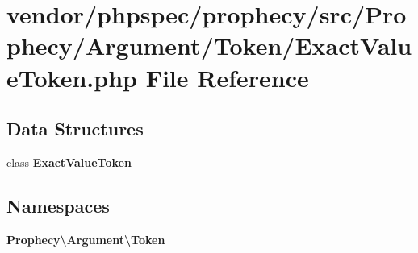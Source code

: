 \section{vendor/phpspec/prophecy/src/\+Prophecy/\+Argument/\+Token/\+Exact\+Value\+Token.php File Reference}
\label{_exact_value_token_8php}
\subsection*{Data Structures}
\begin{DoxyCompactItemize}
\item 
class {\bf Exact\+Value\+Token}
\end{DoxyCompactItemize}
\subsection*{Namespaces}
\begin{DoxyCompactItemize}
\item 
 {\bf Prophecy\textbackslash{}\+Argument\textbackslash{}\+Token}
\end{DoxyCompactItemize}

